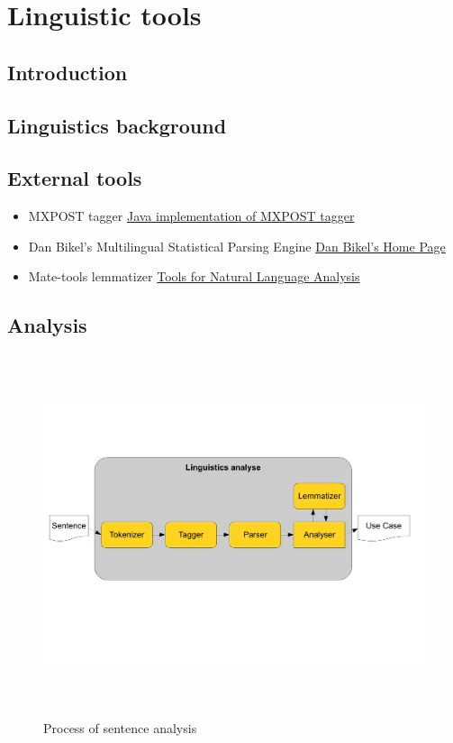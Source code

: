 \section{Linguistic tools}

\subsection{Introduction}

\subsection{Linguistics background}

\subsection{External tools}

\begin{itemize}
\item MXPOST tagger \href{http://www.inf.ed.ac.uk/resources/nlp/local_doc/MXPOST.html}{Java implementation of MXPOST tagger}
\item Dan Bikel's Multilingual Statistical Parsing Engine \href{http://www.cis.upenn.edu/~dbikel/software.html#stat-parser}{Dan Bikel’s Home Page}
\item Mate-tools lemmatizer \href{http://code.google.com/p/mate-tools/}{Tools for Natural Language Analysis}
\end{itemize}

\subsection{Analysis}

\begin{figure}[h]
  \centering
  \includegraphics[height=300pt]{images/LinguisticsAnalyse}
  \caption{Process of sentence analysis}
  \label{fig:LinguisticsAnalyse}
\end{figure}


